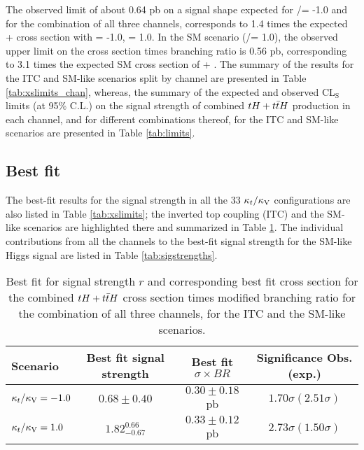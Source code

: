 The observed limit of about 0.64 pb on a signal shape expected for \Ct/\CV = -1.0 and for the combination of all three channels, corresponds to 1.4 times the expected \tH + \ttH cross section with \Ct = -1.0, \CV = 1.0. In the SM scenario (\Ct/\CV = 1.0), the observed upper limit on the cross section times branching ratio is 0.56 pb, corresponding to 3.1 times the expected SM cross section of \tH + \ttH. The summary of the results for the ITC and SM-like scenarios split by channel are presented in Table \ref{tab:xslimits_chan}, whereas, the summary of the expected and observed CL$_\text{S}$ limits (at 95\% C.L.) on the signal strength of combined $tH+t\bar{t}H$ production in each channel, and for different combinations thereof, for the ITC  and SM-like scenarios are presented in Table \ref{tab:limits}.

\subsection{Best fit}

The best-fit results for the signal strength in all the 33 $\kappa_t/\kappa_\text{V}$ configurations are also listed in Table \ref{tab:xslimits}; the inverted top coupling (ITC) and the SM-like scenarios are highlighted there and summarized in Table \ref{tab:fit_results_itc_sm}. The individual contributions from all the channels to the best-fit signal strength for the SM-like Higgs signal are listed in Table \ref{tab:sigstrengths}.

\begin{table}[h!]
\centering
\begin{tabular}{lccc}\hline
Scenario        & Best fit signal strength  & Best fit $\sigma\times BR$ & Significance Obs.(exp.)          \\\hline
$\kappa_t/\kappa_\text{V}=-1.0$  & $0.68\pm0.40$             & $0.30 \pm 0.18$ pb         & $1.70 \sigma (2.51 \sigma) $     \\
$\kappa_t/\kappa_\text{V}=1.0$   & $1.82^{0.66}_{-0.67}$     & $0.33 \pm 0.12$ pb         & $2.73 \sigma (1.50 \sigma) $     \\\hline
\end{tabular}
\caption[Fit results for the ITC and SM scenarios]{Best fit for signal strength $r$ and corresponding best fit cross section for the combined $tH+t\bar{t}H$ cross section times modified branching ratio for the combination of all three channels, for the ITC and the SM-like scenarios.}
\label{tab:fit_results_itc_sm}
\end{table}

